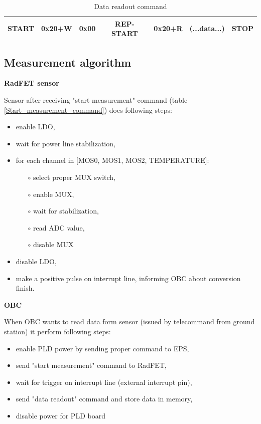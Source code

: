     \begin{table}[H]
        \begin{center}
            \begin{tabular}{|c|c|c|c|c|c|c|}
                \hline
                START & 0x20+W & 0x00 & REP-START & 0x20+R & (...data...) & STOP \\ \hline
            \end{tabular}
        \end{center}
        \caption{Data readout command}
        \label{Data_readout_command}
    \end{table}

    \subsection{Measurement algorithm}
    \bigskip \textbf{RadFET sensor}

    Sensor after receiving "start measurement" command (table \ref{Start_measurement_command}) does following steps:
    \begin{itemize}
        \item enable LDO,
        \item wait for power line stabilization,
        \item for each channel in [MOS0, MOS1, MOS2, TEMPERATURE]:
        \begin{itemize}
            \item[$\circ$] select proper MUX switch,
            \item[$\circ$] enable MUX,
            \item[$\circ$] wait for stabilization,
            \item[$\circ$] read ADC value,
            \item[$\circ$] disable MUX
        \end{itemize}
        \item disable LDO,
        \item make a positive pulse on interrupt line, informing OBC about conversion finish.
    \end{itemize}

    \bigskip \textbf{OBC}

    When OBC wants to read data form sensor (issued by telecommand from ground station) it perform following steps:
    \begin{itemize}
        \item enable PLD power by sending proper command to EPS,
        \item send "start measurement" command to RadFET,
        \item wait for trigger on interrupt line (external interrupt pin),
        \item send "data readout" command and store data in memory,
        \item disable power for PLD board
    \end{itemize}

